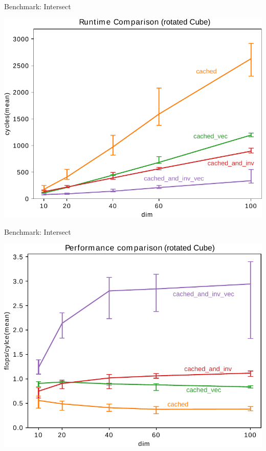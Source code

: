 \documentclass[table]{beamer}
\begin{document}
\begin{frame}{Benchmark: Intersect}
	\begin{center}
	    \includegraphics[scale=0.7]{polytopeT_2.pdf}
	\end{center}
\end{frame}

\begin{frame}{Benchmark: Intersect}
	\begin{center}
	    \includegraphics[scale=0.7]{polytopeT_3.pdf}
	\end{center}
\end{frame}
\end{document}
